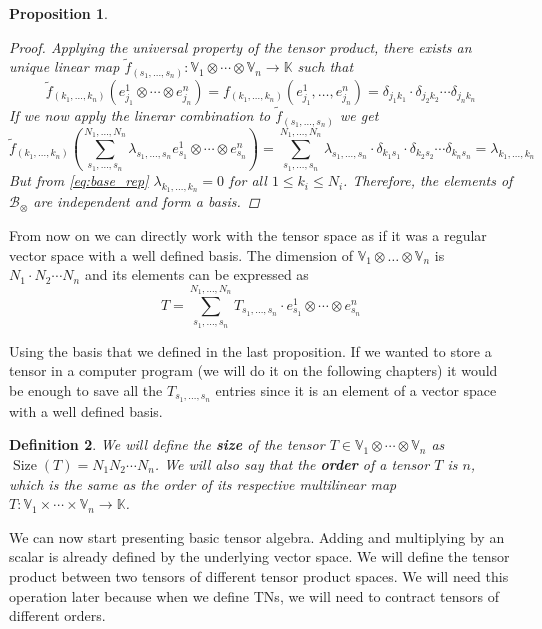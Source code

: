 \documentclass[11pt,a4paper,openright,oneside]{book}
\numberwithin{equation}{section}
\newtheorem{defn0}{Definition}[chapter]
\newtheorem{prop0}[defn0]{Proposition}
\newenvironment{definition}{ \begin{defn0}}{\end{defn0}}
\newenvironment{proposition}{\bigskip \begin{prop0}}{\end{prop0}}
\DeclareMathOperator{\size}{Size}
\begin{document}
\begin{proposition}
\begin{proof}
Applying the universal property of the tensor product, there exists an unique linear map $\tilde f_{(s_1, \dots, s_n)} : \mathbb{V}_1 \otimes \cdots \otimes \mathbb{V}_n \rightarrow \mathbb{K}$
such that
$$\tilde f_{(k_1, \dots, k_n)}(e_{j_1}^1 \otimes \cdots \otimes e_{j_n}^n) = f_{(k_1, \dots, k_n)}(e_{j_1}^1, \dots, e_{j_n}^n) = \delta_{j_1 k_1} \cdot \delta_{j_2 k_2} \cdots \delta_{j_n k_n}$$
If we now apply the linerar combination to $\tilde f_{(s_1, \dots, s_n)}$ we get
$$\tilde f_{(k_1, \dots, k_n)} \left( 
\sum_{s_1, \dots, s_n}^{N_1, \dots, N_n} \lambda_{s_1, \dots, s_n} e_{s_1}^1 \otimes \cdots \otimes e_{s_n}^n 
\right) =  \sum_{s_1, \dots, s_n}^{N_1, \dots, N_n} \lambda_{s_1, \dots, s_n} \cdot \delta_{k_1 s_1} \cdot \delta_{k_2 s_2} \cdots \delta_{k_n s_n} = \lambda_{k_1, \dots, k_n}$$
But from \eqref{eq:base_rep} $\lambda_{k_1, \dots, k_n} = 0$ for all
$1 \leqslant k_i \leqslant N_i$. Therefore, the elements of $\mathcal{B}_\otimes$ are independent and form a basis.
\end{proof}
\end{proposition}


From now on we can directly work with the tensor space as if it was a regular vector space
with a well defined basis. The dimension
    of ${\mathbb{V}_1 \otimes \dots \otimes \mathbb{V}_n}$ is ${N_1 \cdot N_2 \cdots N_n}$ and its elements can be expressed as
    \begin{equation} \label{eq:base-representation}
T = \sum_{s_1, \dots, s_n}^{N_1, \dots, N_n} T_{s_1, \dots, s_n} \cdot  e_{s_1}^1 \otimes \cdots \otimes e_{s_n}^n
\end{equation}

Using the basis that we defined in the last proposition. 
If we wanted to store a tensor in a computer program (we will do it on the following chapters) it would be enough to save all the $T_{s_1, \dots, s_n}$ entries
since it is an element of a vector space with a well defined basis.

\begin{definition}
We will define the \textbf{size} of the tensor $T \in \mathbb{V}_1 \otimes \cdots \otimes \mathbb{V}_n$ as $\size(T) = N_1 N_2 \cdots N_n$. We will 
also say that the \textbf{order} of a tensor $T$ is $n$, which is the same as the order of its respective multilinear map $T: \mathbb{V}_1 \times \cdots
\times \mathbb{V}_n \rightarrow \mathbb{K}$.
\end{definition}

We can now start presenting basic tensor algebra. Adding and multiplying by an scalar is already defined by the underlying
vector space. We will define the tensor product 
between two tensors of different tensor product spaces. We will need this operation
later because when we define \gls{TN}s, we will need to contract tensors of different orders.
\end{document}
